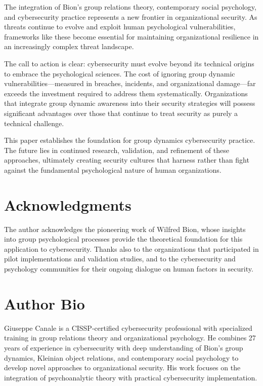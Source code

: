 \documentclass[11pt,a4paper]{article}
\begin{document}
The integration of Bion's group relations theory, contemporary social psychology, and cybersecurity practice represents a new frontier in organizational security. As threats continue to evolve and exploit human psychological vulnerabilities, frameworks like these become essential for maintaining organizational resilience in an increasingly complex threat landscape.

The call to action is clear: cybersecurity must evolve beyond its technical origins to embrace the psychological sciences. The cost of ignoring group dynamic vulnerabilities—measured in breaches, incidents, and organizational damage—far exceeds the investment required to address them systematically. Organizations that integrate group dynamic awareness into their security strategies will possess significant advantages over those that continue to treat security as purely a technical challenge.

This paper establishes the foundation for group dynamics cybersecurity practice. The future lies in continued research, validation, and refinement of these approaches, ultimately creating security cultures that harness rather than fight against the fundamental psychological nature of human organizations.

\section*{Acknowledgments}

The author acknowledges the pioneering work of Wilfred Bion, whose insights into group psychological processes provide the theoretical foundation for this application to cybersecurity. Thanks also to the organizations that participated in pilot implementations and validation studies, and to the cybersecurity and psychology communities for their ongoing dialogue on human factors in security.

\section*{Author Bio}

Giuseppe Canale is a CISSP-certified cybersecurity professional with specialized training in group relations theory and organizational psychology. He combines 27 years of experience in cybersecurity with deep understanding of Bion's group dynamics, Kleinian object relations, and contemporary social psychology to develop novel approaches to organizational security. His work focuses on the integration of psychoanalytic theory with practical cybersecurity implementation.
\end{document}
